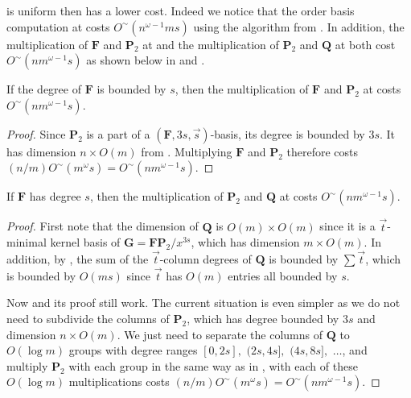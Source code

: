 is uniform then 
has a lower cost. Indeed we notice that the order basis computation
at  costs $O^{\sim}\left(n^{\omega-1}ms\right)$
using the algorithm from . In addition,
the multiplication of $\mathbf{F}$ and $\mathbf{P}_{2}$ at 
and the multiplication of $\mathbf{P}_{2}$ and $\mathbf{Q}$ at 
both cost $O^{\sim}\left(nm^{\omega-1}s\right)$ as shown below in
 and . 
\begin{lem}
\label{lem:multiplyFP2WithUniformShift}If the degree of $\mathbf{F}$
is bounded by $s$, then the multiplication of $\mathbf{F}$ and $\mathbf{P}_{2}$
at  costs $O^{\sim}\left(nm^{\omega-1}s\right)$.\end{lem}
\begin{proof}
Since $\mathbf{P}_{2}$ is a part of a $\left(\mathbf{F},3s,\vec{s}\right)$-basis,
its degree is bounded by $3s$. It has dimension $n\times O\left(m\right)$
from .
Multiplying $\mathbf{F}$ and $\mathbf{P}_{2}$ therefore costs $(n/m)O^{\sim}\left(m^{\omega}s\right)=O^{\sim}\left(nm^{\omega-1}s\right)$.\end{proof}
\begin{lem}
\label{lem:multiplyP2QWithUniformShift}If $\mathbf{F}$ has degree
$s$, then the multiplication of $\mathbf{P}_{2}$ and $\mathbf{Q}$
at  costs $O^{\sim}\left(nm^{\omega-1}s\right)$.\end{lem}
\begin{proof}
First note that the dimension of $\mathbf{Q}$ is $O\left(m\right)\times O\left(m\right)$
since it is a $\vec{t}$-minimal kernel basis of $\mathbf{G}=\mathbf{F}\mathbf{P}_{2}/x^{3s}$,
which has dimension $m\times O\left(m\right)$. In addition, by ,
the sum of the $\vec{t}$-column degrees of $\mathbf{Q}$ is bounded
by $\sum\vec{t}$, which is bounded by $O\left(ms\right)$ since $\vec{t}$
has $O\left(m\right)$ entries all bounded by $s$.

Now  and its proof still
work. The current situation is even simpler as we do not need to subdivide
the columns of $\mathbf{P}_{2}$, which has degree bounded by $3s$
and dimension $n\times O\left(m\right)$. We just need to separate
the columns of $\mathbf{Q}$ to $O\left(\log m\right)$ groups with
degree ranges $\left[0,2s\right],$ $(2s,4s],$ $(4s,8s],$ $\dots$,
and multiply $\mathbf{P}_{2}$ with each group in the same way as
in , with each of these
$O\left(\log m\right)$ multiplications costs $(n/m)O^{\sim}\left(m^{\omega}s\right)=O^{\sim}\left(nm^{\omega-1}s\right)$.\end{proof}
